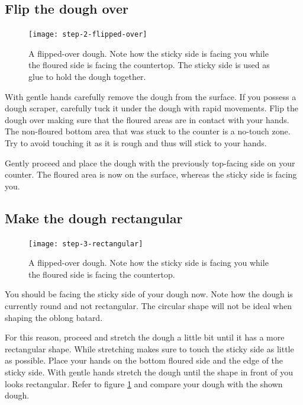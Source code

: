 \subsection[Flipping the dough]{Flip the dough over}

\begin{figure}[!htb]
  \texttt{[image: step-2-flipped-over]}
  \caption{A flipped-over dough. Note how the sticky side is facing
  you while the floured side is facing the countertop. The sticky side
  is used as glue to hold the dough together.}
\end{figure}

With gentle hands carefully remove the dough from the surface. If
you possess a dough scraper, carefully tuck it under the dough with
rapid movements. Flip the dough over making sure that the floured
areas are in contact with your hands. The non-floured bottom area that was
stuck to the counter is a no-touch zone. Try to avoid touching it
as it is rough and thus will stick to your hands.

Gently proceed and place the dough with the previously top-facing side
on your counter. The floured area is now on the surface, whereas the
sticky side is facing you.

\subsection[Create rectangular shape]{Make the dough rectangular}

\begin{figure}[htb!]
  \texttt{[image: step-3-rectangular]}
  \caption{A flipped-over dough. Note how the sticky side is facing
  you while the floured side is facing the countertop.}
  \label{fig:shaping-rectangular-dough}
\end{figure}

You should be facing the sticky side of your dough now. Note how
the dough is currently round and not rectangular. The circular
shape will not be ideal when shaping the oblong batard.

For this reason, proceed and stretch the dough a little bit until
it has a more rectangular shape. While stretching makes sure to touch
the sticky side as little as possible. Place your hands on the bottom
floured side and the edge of the sticky side. With gentle hands
stretch the dough until the shape in front of you looks rectangular.
Refer to figure \ref{fig:shaping-rectangular-dough} and compare
your dough with the shown dough.

